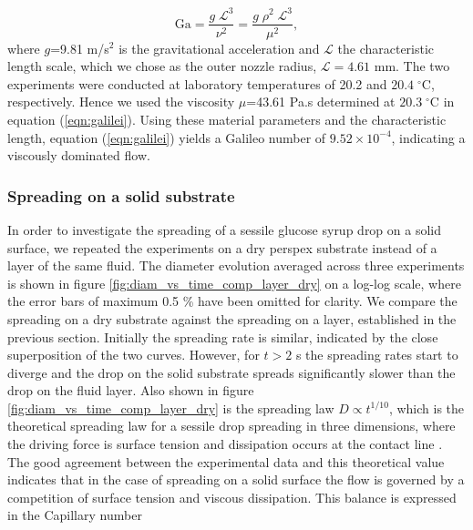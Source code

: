 \documentclass[aip,graphicx]{revtex4-1}
\newcommand{\sym}[1]{\text{#1}}
\newcommand{\degC}[1]{#1 \; ^{\circ} \text{C}}
\begin{document}
\begin{equation}
 \sym{Ga} = \frac{g \; \mathcal{L}^3}{\nu^2} = \frac{g \; \rho^2 \; \mathcal{L}^3}{\mu^2},
 \label{eqn:galilei}
\end{equation}
where $g$=9.81 m/s$^2$ is the gravitational acceleration and $\mathcal{L}$ the characteristic length scale, which we chose as the outer nozzle radius, $\mathcal{L}=4.61$ mm.
The two experiments were conducted at laboratory temperatures of 20.2 and $\degC{20.4}$, respectively. 
Hence we used the viscosity $\mu$=43.61 Pa.s determined at $\degC{20.3}$ in equation (\ref{eqn:galilei}). 
Using these material parameters and the characteristic length, equation (\ref{eqn:galilei}) yields a Galileo number of $9.52 \times 10^{-4}$, indicating a viscously dominated flow.


\subsubsection{Spreading on a solid substrate}

In order to investigate the spreading of a sessile glucose syrup drop on a solid surface, we repeated the experiments on a dry perspex substrate instead of a layer of the same fluid.
The diameter evolution averaged across three experiments is shown in figure \ref{fig:diam_vs_time_comp_layer_dry} on a log-log scale, where the error bars of maximum 0.5 \% have been omitted for clarity.
We compare the spreading on a dry substrate against the spreading on a layer, established in the previous section.
Initially the spreading rate is similar, indicated by the close superposition of the two curves.
However, for $t > 2$ s the spreading rates start to diverge and the drop on the solid substrate spreads significantly slower than the drop on the fluid layer.
Also shown in figure \ref{fig:diam_vs_time_comp_layer_dry} is the spreading law $D \propto t^{1/10}$, which is the theoretical spreading law for a sessile drop spreading in three dimensions, where the driving force is surface tension and dissipation occurs at the contact line \cite{bonn2009wetting, cazabat1986dynamics}.
The good agreement between the experimental data and this theoretical value indicates that in the case of spreading on a solid surface the flow is governed by a competition of surface tension and viscous dissipation.
This balance is expressed in the Capillary number
\end{document}
